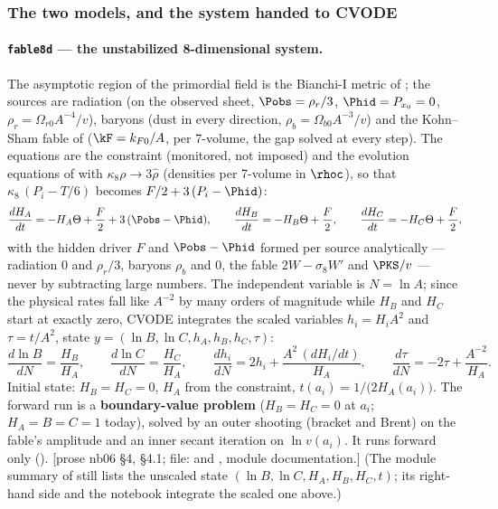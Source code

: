 \subsubsection{The two models, and the system handed to CVODE}
\label{sec:4.7.1}

\paragraph{\texttt{fable8d} --- the unstabilized 8-dimensional system.} The asymptotic region of the
primordial field is the Bianchi-I metric of ; the sources are radiation (on the observed
sheet, $\Pobs=\rho_r/3$, $\Phid=P_{x_0}=0$, $\rho_r=\Omega_{r0}A^{-4}/v$), baryons (dust in every
direction, $\rho_b=\Omega_{b0}A^{-3}/v$) and the Kohn--Sham fable of  ($\kF=k_{F0}/A$, per
7-volume, the gap solved at every step). The equations are the constraint (monitored, not imposed) and the
evolution equations of  with $\kappa_8\rho\to3\hat\rho$ (densities per 7-volume in $\rhoc$),
so that $\kappa_8\,(P_i-T/6)$ becomes $F/2+3\,(P_i-\Phid)$:
\[
  \frac{dH_A}{dt}=-H_A\Theta+\frac F2+3\,(\Pobs-\Phid),\qquad
  \frac{dH_B}{dt}=-H_B\Theta+\frac F2,\qquad
  \frac{dH_C}{dt}=-H_C\Theta+\frac F2 ,
\]
with the hidden driver $F$ and $\Pobs-\Phid$ formed per source analytically --- radiation $0$ and
$\rho_r/3$, baryons $\rho_b$ and $0$, the fable $2W-\sigma_8W'$ and $\PKS/v$ --- never by subtracting large
numbers. The independent variable is $N=\ln A$; since the physical rates fall like $A^{-2}$ by many orders
of magnitude while $H_B$ and $H_C$ start at exactly zero, CVODE integrates the scaled variables
$h_i=H_iA^2$ and $\tau=t/A^2$, state $y=(\ln B,\ln C,h_A,h_B,h_C,\tau)$:
\[
  \frac{d\ln B}{dN}=\frac{H_B}{H_A},\qquad \frac{d\ln C}{dN}=\frac{H_C}{H_A},\qquad
  \frac{dh_i}{dN}=2h_i+\frac{A^2\,(dH_i/dt)}{H_A},\qquad \frac{d\tau}{dN}=-2\tau+\frac{A^{-2}}{H_A} .
\]
Initial state: $H_B=H_C=0$, $H_A$ from the constraint, $t(a_i)=1/\bigl(2H_A(a_i)\bigr)$. The forward run is a
\textbf{boundary-value problem} ($H_B=H_C=0$ at $a_i$; $H_A=B=C=1$ today), solved by an outer shooting
(bracket and Brent) on the fable's amplitude and an inner secant iteration on $\ln v(a_i)$. It runs forward
only (). [prose nb06 \S4, \S4.1; file: 
and , module documentation.] (The module summary of  still lists the unscaled
state $(\ln B,\ln C,H_A,H_B,H_C,t)$; its right-hand side and the notebook integrate the scaled one above.)

